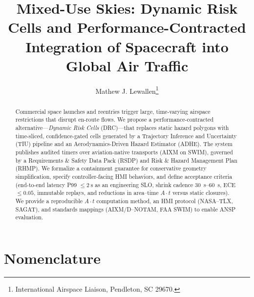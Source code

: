 \documentclass[journal]{new-aiaa}
\title{Mixed-Use Skies: Dynamic Risk Cells and Performance-Contracted Integration of Spacecraft into Global Air Traffic}
\author{Mathew J. Lewallen\footnote{International Airspace Liaison, Pendleton, SC 29670.}}
\affil{Aerospace Post, Pendleton, S.C., 29670, U.S.A.}
\newcommand{\At}{\ensuremath{A\cdot t}}
\newcommand{\TIU}{\textsc{TIU}}
\newcommand{\ADHE}{\textsc{ADHE}}
\newcommand{\RSDP}{\textsc{RSDP}}
\newcommand{\RHMP}{\textsc{RHMP}}
\begin{document}
\maketitle

\begin{abstract}
Commercial space launches and reentries trigger large, time-varying airspace restrictions that disrupt en-route flows. We propose a performance-contracted alternative—\emph{Dynamic Risk Cells} (DRC)—that replaces static hazard polygons with time-sliced, confidence-gated cells generated by a Trajectory Inference and Uncertainty (\TIU) pipeline and an Aerodynamics-Driven Hazard Estimator (\ADHE). The system publishes audited timers over aviation-native transports (AIXM on SWIM), governed by a Requirements \& Safety Data Pack (\RSDP) and Risk \& Hazard Management Plan (\RHMP). We formalize a containment guarantee for conservative geometry simplification, specify controller-facing HMI behaviors, and define acceptance criteria (end-to-end latency P99 $\le\SI{2}{\second}$ as an engineering SLO, shrink cadence \SIrange{30}{60}{\second}, ECE $\le 0.05$, immutable replays, and reductions in area–time ${\At}$ versus static closures). We provide a reproducible ${\At}$ computation method, an HMI protocol (NASA–TLX, SAGAT), and standards mappings (AIXM/D–NOTAM, FAA SWIM) to enable ANSP evaluation.
\end{abstract}

\section*{Nomenclature}
\end{document}
